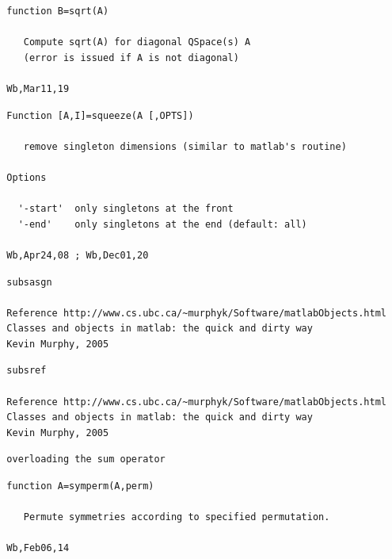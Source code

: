 \documentclass[twoside,12pt]{article}
\begin{document}
\pagebreak[3]



\begin{verbatim}
  function B=sqrt(A)
 
     Compute sqrt(A) for diagonal QSpace(s) A
     (error is issued if A is not diagonal)
 
  Wb,Mar11,19
\end{verbatim}

\pagebreak[3]



\begin{verbatim}
  Function [A,I]=squeeze(A [,OPTS])
 
     remove singleton dimensions (similar to matlab's routine)
 
  Options
 
    '-start'  only singletons at the front
    '-end'    only singletons at the end (default: all)
 
  Wb,Apr24,08 ; Wb,Dec01,20
\end{verbatim}

\pagebreak[3]



\begin{verbatim}
  subsasgn
 
  Reference http://www.cs.ubc.ca/~murphyk/Software/matlabObjects.html
  Classes and objects in matlab: the quick and dirty way
  Kevin Murphy, 2005
\end{verbatim}

\pagebreak[3]



\begin{verbatim}
  subsref
 
  Reference http://www.cs.ubc.ca/~murphyk/Software/matlabObjects.html
  Classes and objects in matlab: the quick and dirty way
  Kevin Murphy, 2005
\end{verbatim}

\pagebreak[3]



\begin{verbatim}
  overloading the sum operator
\end{verbatim}

\pagebreak[3]



\begin{verbatim}
  function A=symperm(A,perm)
 
     Permute symmetries according to specified permutation.
 
  Wb,Feb06,14
\end{verbatim}
\end{document}
